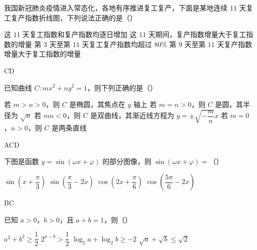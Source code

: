 \begin{problem}
我国新冠肺炎疫情进入常态化，各地有序推进复工复产，下面是某地连续 \(11\) 天复工复产指数折线图，下列说法正确的是（\quad）

\begin{center}
\end{center}

\choices
    {这 \(11\) 天复工指数和复产指数均逐日增加}
    {这 \(11\) 天期间，复产指数增量大于复工指数的增量}
    {第 \(3\) 天至第 \(11\) 天复工复产指数均超过 \(80\%\)}
    {第 \(9\) 天至第 \(11\) 天复产指数增量大于复工指数的增量}
\end{problem}

\begin{answer}
    CD
\end{answer}

\begin{problem}
已知曲线 \(C:mx^2+ny^2=1\)，则下列正确的是（\quad）

\choices
    {若 \(m>n>0\)，则 \(C\) 是椭圆，其焦点在 \(y\) 轴上}
    {若 \(m=n>0\)，则 \(C\) 是圆，其半径为 \(\sqrt n\)}
    {若 \(mn<0\)，则 \(C\) 是双曲线，其渐近线方程为 \(y=\pm\sqrt{-\dfrac{m}{n}}x\)}
    {若 \(m=0\)，\(n>0\)，则 \(C\) 是两条直线}
\end{problem}

\begin{answer}
    ACD
\end{answer}

\begin{problem}
下图是函数 \(y=\sin(\omega x+\varphi)\) 的部分图像，则 \(\sin(\omega x+\varphi)=\)（\quad）

\begin{center}
\end{center}

\choices
    {\(\sin\left(x+\dfrac{\pi}{3}\right)\)}
    {\(\sin\left(\dfrac{\pi}{3}-2x\right)\)}
    {\(\cos\left(2x+\dfrac{\pi}{6}\right)\)}
    {\(\cos\left(\dfrac{5\pi}{6}-2x\right)\)}
\end{problem}

\begin{answer}
    BC
\end{answer}

\begin{problem}
已知 \(a>0\)，\(b>0\)，且 \(a+b=1\)，则（\quad）

\choices
    {\(a^2+b^2\geqslant\dfrac12\)}
    {\(2^{a-b}>\dfrac12\)}
    {\(\log_2a+\log_2b\geqslant-2\)}
    {\(\sqrt a+\sqrt b\leqslant\sqrt2\)}
\end{problem}

